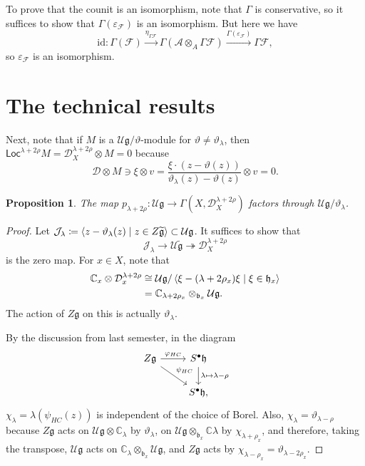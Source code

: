 \documentclass[leqno, openany]{memoir}
\newtheorem{prop}[thm]{Proposition}
\theoremstyle{definition}
\theoremstyle{remark}
\theoremstyle{plain}
\theoremstyle{definition}
\theoremstyle{remark}
\newcommand{\C}{\mathbb{C}}
\newcommand{\U}{\mathcal{U}}
\newcommand{\g}{\mathfrak{g}}
\newcommand{\h}{\mathfrak{h}}
\newcommand{\ep}{\varepsilon}
\newcommand{\mc}[1]{\mathcal{#1}}
\newcommand{\mf}[1]{\mathfrak{#1}}
\newcommand{\mr}[1]{\mathrm{#1}}
\newcommand{\ms}[1]{\mathsf{#1}}
\newcommand{\wt}[1]{\widetilde{#1}}
\begin{document}
To prove that the counit is an isomorphism, note that $\Gamma$ is conservative, so it suffices to show that $\Gamma(\ep_{\mc{F}})$ is an isomorphism. But here we have
\[ \mr{id} \colon \Gamma(\mc{F}) \xrightarrow{\eta_{\Gamma \mc{F}}} \Gamma(\mc{A} \otimes_A \Gamma \mc{F}) \xrightarrow{\Gamma(\ep_{\mc{F}})} \Gamma \mc{F}, \]
so $\ep_{\mc{F}}$ is an isomorphism.

\section{The technical results}

Next, note that if $M$ is a $\mc{U} \g /\vartheta$-module for $\vartheta \neq \vartheta_{\lambda}$, then $\ms{Loc}^{\lambda + 2\rho} M = \mc{D}_X^{\lambda + 2 \rho} \otimes M = 0$ because
\[ \mc{D} \otimes M \ni \xi \otimes v = \frac{\xi \cdot (z - \vartheta(z))}{\vartheta_{\lambda}(z) - \vartheta(z)} \otimes v = 0. \]

\begin{prop}
    The map $p_{\lambda + 2\rho} \colon \mc{U} \g \to \Gamma(X, \mc{D}_X^{\lambda + 2\rho})$ factors through $\mc{U} \g / \vartheta_{\lambda}$.
\end{prop}

\begin{proof}
    Let $\mc{J}_{\lambda} \coloneqq \ev{z - \vartheta_{\lambda}(z) \mid z \in Z \wt{\g}} \subset \U \g$. It suffices to show that
    \[ \mc{J}_{\lambda} \to \U \wt{\g} \twoheadrightarrow \mc{D}_X^{\lambda + 2\rho} \]
    is the zero map. For $x \in X$, note that
    \begin{align*}
        \C_x \otimes \mc{D}_x^{\lambda + 2 \rho} &\cong \U \g / \ev{\xi - (\lambda + 2\rho_x) \xi \mid \xi \in \h_x} \\
        &= \C_{\lambda + 2\rho_x} \otimes_{\mf{b}_x} \U \g.
    \end{align*}
    The action of $Z \g$ on this is actually $\vartheta_{\lambda}$.

    By the discussion from last semester, in the diagram
    \begin{equation*}
    \begin{tikzcd}
        Z \g \ar{r}{\varphi_{HC}} \ar{dr}{\psi_{HC}} & S^{\bullet} \h \ar{d}{\lambda \mapsto \lambda-\rho} \\
        & S^{\bullet} \h,
    \end{tikzcd}
    \end{equation*}
    $\chi_{\lambda} = \lambda(\psi_{HC}(z))$ is independent of the choice of Borel. Also, $\chi_{\lambda} = \vartheta_{\lambda-\rho}$ because $Z \g$ acts on $\U \g \otimes \C_{\lambda}$ by $\vartheta_{\lambda}$, on $\U \g \otimes_{\mf{b}_x} \C \lambda$ by $\chi_{\lambda + \rho_x}$, and therefore, taking the transpose, $\U \g$ acts on $\C_{\lambda} \otimes_{\mf{b}_x} \U \g$, and $Z \g$ acts by $\chi_{\lambda - \rho_x}= \vartheta_{\lambda - 2\rho_x}$.
\end{proof}
\end{document}
